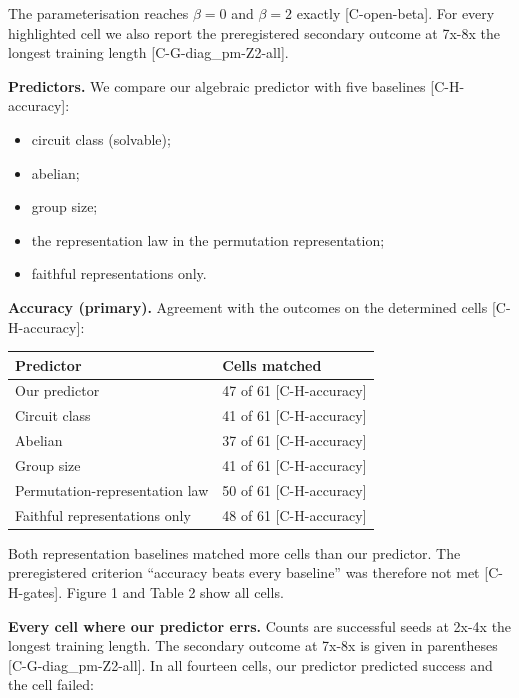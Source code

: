 \documentclass[10pt,twocolumn,a4paper]{article}
\providecommand{\tightlist}{\setlength{\itemsep}{0pt}\setlength{\parskip}{0pt}}
\begin{document}
The parameterisation reaches \(\beta = 0\) and \(\beta = 2\) exactly {[}C-open-beta{]}. For every highlighted cell we also report the preregistered secondary outcome at 7x-8x the longest training length {[}C-G-diag\_pm-Z2-all{]}.

\textbf{Predictors.} We compare our algebraic predictor with five baselines {[}C-H-accuracy{]}:

\begin{itemize}
\tightlist
\item
  circuit class (solvable);
\item
  abelian;
\item
  group size;
\item
  the representation law in the permutation representation;
\item
  faithful representations only.
\end{itemize}

\textbf{Accuracy (primary).} Agreement with the outcomes on the determined cells {[}C-H-accuracy{]}:

\begin{center}\scriptsize\begin{tabular}{@{}ll@{}}
\toprule\noalign{}
Predictor & Cells matched \\
\midrule\noalign{}
\bottomrule\noalign{}
Our predictor & 47 of 61 {[}C-H-accuracy{]} \\
Circuit class & 41 of 61 {[}C-H-accuracy{]} \\
Abelian & 37 of 61 {[}C-H-accuracy{]} \\
Group size & 41 of 61 {[}C-H-accuracy{]} \\
Permutation-representation law & 50 of 61 {[}C-H-accuracy{]} \\
Faithful representations only & 48 of 61 {[}C-H-accuracy{]} \\
\end{tabular}\end{center}

Both representation baselines matched more cells than our predictor. The preregistered criterion ``accuracy beats every baseline'' was therefore not met {[}C-H-gates{]}. Figure 1 and Table 2 show all cells.

\textbf{Every cell where our predictor errs.} Counts are successful seeds at 2x-4x the longest training length. The secondary outcome at 7x-8x is given in parentheses {[}C-G-diag\_pm-Z2-all{]}. In all fourteen cells, our predictor predicted success and the cell failed:
\end{document}
